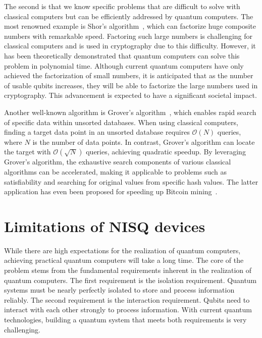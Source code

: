 \documentclass[12pt,dvipdfmx,twoside,openright]{report}
\begin{document}
The second is that we know specific problems that are difficult to solve with classical computers but can be efficiently addressed by quantum computers.
The most renowned example is Shor's algorithm~\cite{shor1994algorithms}, which can factorize huge composite numbers with remarkable speed.
Factoring such large numbers is challenging for classical computers and is used in cryptography due to this difficulty.
However, it has been theoretically demonstrated that quantum computers can solve this problem in polynomial time.
Although current quantum computers have only achieved the factorization of small numbers, it is anticipated that as the number of usable qubits increases, they will be able to factorize the large numbers used in cryptography.
This advancement is expected to have a significant societal impact.

Another well-known algorithm is Grover's algorithm~\cite{grover1996fast}, which enables rapid search of specific data within unsorted databases.
When using classical computers, finding a target data point in an unsorted database requires $\mathcal{O}(N)$ queries, where $N$ is the number of data points.
In contrast, Grover's algorithm can locate the target with $\mathcal{O}(\sqrt{N})$ queries, achieving quadratic speedup.
By leveraging Grover's algorithm, the exhaustive search components of various classical algorithms can be accelerated, making it applicable to problems such as satisfiability and searching for original values from specific hash values.
The latter application has even been proposed for speeding up Bitcoin mining~\cite{bitcoin}.




\section{Limitations of NISQ devices}
While there are high expectations for the realization of quantum computers, achieving practical quantum computers will take a long time.
The core of the problem stems from the fundamental requirements inherent in the realization of quantum computers.
The first requirement is the isolation requirement.
Quantum systems must be nearly perfectly isolated to store and process information reliably.
The second requirement is the interaction requirement.
Qubits need to interact with each other strongly to process information.
With current quantum technologies, building a quantum system that meets both requirements is very challenging.
\end{document}
